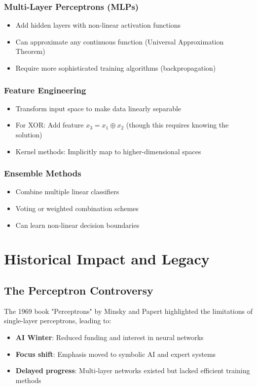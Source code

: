 \subsubsection{Multi-Layer Perceptrons (MLPs)}
\begin{itemize}
    \item Add hidden layers with non-linear activation functions
    \item Can approximate any continuous function (Universal Approximation Theorem)
    \item Require more sophisticated training algorithms (backpropagation)
\end{itemize}

\subsubsection{Feature Engineering}
\begin{itemize}
    \item Transform input space to make data linearly separable
    \item For XOR: Add feature \(x_3 = x_1 \oplus x_2\) (though this requires knowing the solution)
    \item Kernel methods: Implicitly map to higher-dimensional spaces
\end{itemize}

\subsubsection{Ensemble Methods}
\begin{itemize}
    \item Combine multiple linear classifiers
    \item Voting or weighted combination schemes
    \item Can learn non-linear decision boundaries
\end{itemize}

\section{Historical Impact and Legacy}
\subsection{The Perceptron Controversy}
The 1969 book "Perceptrons" by Minsky and Papert highlighted the limitations of single-layer perceptrons, leading to:
\begin{itemize}
    \item \textbf{AI Winter}: Reduced funding and interest in neural networks
    \item \textbf{Focus shift}: Emphasis moved to symbolic AI and expert systems
    \item \textbf{Delayed progress}: Multi-layer networks existed but lacked efficient training methods
\end{itemize}

